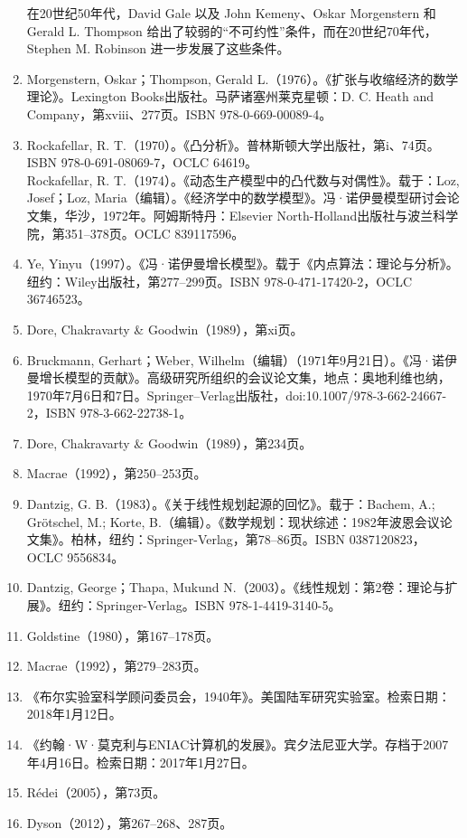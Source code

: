 \begin{enumerate}
在20世纪50年代，David Gale 以及 John Kemeny、Oskar Morgenstern 和 Gerald L. Thompson 给出了较弱的“不可约性”条件，而在20世纪70年代，Stephen M. Robinson 进一步发展了这些条件。
\item Morgenstern, Oskar；Thompson, Gerald L.（1976）。《扩张与收缩经济的数学理论》。Lexington Books出版社。马萨诸塞州莱克星顿：D. C. Heath and Company，第xviii、277页。ISBN 978-0-669-00089-4。  
\item Rockafellar, R. T.（1970）。《凸分析》。普林斯顿大学出版社，第i、74页。ISBN 978-0-691-08069-7，OCLC 64619。\\  
Rockafellar, R. T.（1974）。《动态生产模型中的凸代数与对偶性》。载于：Loz, Josef；Loz, Maria（编辑）。《经济学中的数学模型》。冯·诺伊曼模型研讨会论文集，华沙，1972年。阿姆斯特丹：Elsevier North-Holland出版社与波兰科学院，第351–378页。OCLC 839117596。\\  
\item Ye, Yinyu（1997）。《冯·诺伊曼增长模型》。载于《内点算法：理论与分析》。纽约：Wiley出版社，第277–299页。ISBN 978-0-471-17420-2，OCLC 36746523。  
\item Dore, Chakravarty & Goodwin（1989），第xi页。  
\item Bruckmann, Gerhart；Weber, Wilhelm（编辑）（1971年9月21日）。《冯·诺伊曼增长模型的贡献》。高级研究所组织的会议论文集，地点：奥地利维也纳，1970年7月6日和7日。Springer–Verlag出版社，doi:10.1007/978-3-662-24667-2，ISBN 978-3-662-22738-1。
\item Dore, Chakravarty & Goodwin（1989），第234页。  
\item Macrae（1992），第250–253页。  
\item Dantzig, G. B.（1983）。《关于线性规划起源的回忆》。载于：Bachem, A.; Grötschel, M.; Korte, B.（编辑）。《数学规划：现状综述：1982年波恩会议论文集》。柏林，纽约：Springer-Verlag，第78–86页。ISBN 0387120823，OCLC 9556834。  
\item Dantzig, George；Thapa, Mukund N.（2003）。《线性规划：第2卷：理论与扩展》。纽约：Springer-Verlag。ISBN 978-1-4419-3140-5。  
\item Goldstine（1980），第167–178页。  
\item Macrae（1992），第279–283页。  
\item 《布尔实验室科学顾问委员会，1940年》。美国陆军研究实验室。检索日期：2018年1月12日。  
\item 《约翰·W·莫克利与ENIAC计算机的发展》。宾夕法尼亚大学。存档于2007年4月16日。检索日期：2017年1月27日。  
\item Rédei（2005），第73页。  
\item Dyson（2012），第267–268、287页。  

\end{enumerate}
